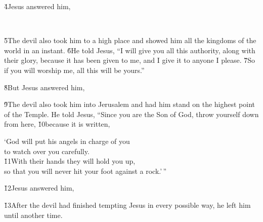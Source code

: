 \v{4}Jesus answered him, 

\begin{poetry}
\poeml {} \\
\poemll    {}
\end{poetry}

\v{5}The devil also took him to a high place and showed him all the kingdoms of the world in an instant. \v{6}He told Jesus, ``I will give you all this authority, along with their glory, because it has been given to me, and I give it to anyone I please. \v{7}So if you will worship me, all this will be yours.''

\v{8}But Jesus answered him, 

\begin{poetry}
\poeml {}
\end{poetry}

\v{9}The devil also took him into Jerusalem and had him stand on the highest point of the Temple. He told Jesus, ``Since you are the Son of God, throw yourself down from here, \v{10}because it is written,

\begin{poetry}
\poeml `God will put his angels in charge of you \\
\poemll    to watch over you carefully. \\
\poeml \v{11}With their hands they will hold you up, \\
\poemll    so that you will never hit your foot against a rock.'\,''
\end{poetry}

\v{12}Jesus answered him, 

\v{13}After the devil had finished tempting Jesus in every possible way, he left him until another time.

